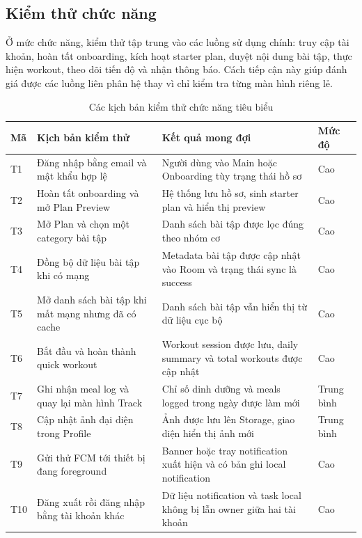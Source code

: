 \subsection{Kiểm thử chức năng}

Ở mức chức năng, kiểm thử tập trung vào các luồng sử dụng chính: truy cập tài khoản, hoàn tất onboarding, kích hoạt starter plan, duyệt nội dung bài tập, thực hiện workout, theo dõi tiến độ và nhận thông báo. Cách tiếp cận này giúp đánh giá được các luồng liên phân hệ thay vì chỉ kiểm tra từng màn hình riêng lẻ.

\begin{table}[H]
\centering
\small
\caption{Các kịch bản kiểm thử chức năng tiêu biểu}
\label{tab:functional-test-scenarios}
\begin{tabular}{|p{1.2cm}|p{4.1cm}|p{4.2cm}|p{2.7cm}|}
\hline
\textbf{Mã} & \textbf{Kịch bản kiểm thử} & \textbf{Kết quả mong đợi} & \textbf{Mức độ} \\ \hline
T1 & Đăng nhập bằng email và mật khẩu hợp lệ & Người dùng vào Main hoặc Onboarding tùy trạng thái hồ sơ & Cao \\ \hline
T2 & Hoàn tất onboarding và mở Plan Preview & Hệ thống lưu hồ sơ, sinh starter plan và hiển thị preview & Cao \\ \hline
T3 & Mở Plan và chọn một category bài tập & Danh sách bài tập được lọc đúng theo nhóm cơ & Cao \\ \hline
T4 & Đồng bộ dữ liệu bài tập khi có mạng & Metadata bài tập được cập nhật vào Room và trạng thái sync là success & Cao \\ \hline
T5 & Mở danh sách bài tập khi mất mạng nhưng đã có cache & Danh sách bài tập vẫn hiển thị từ dữ liệu cục bộ & Cao \\ \hline
T6 & Bắt đầu và hoàn thành quick workout & Workout session được lưu, daily summary và total workouts được cập nhật & Cao \\ \hline
T7 & Ghi nhận meal log và quay lại màn hình Track & Chỉ số dinh dưỡng và meals logged trong ngày được làm mới & Trung bình \\ \hline
T8 & Cập nhật ảnh đại diện trong Profile & Ảnh được lưu lên Storage, giao diện hiển thị ảnh mới & Trung bình \\ \hline
T9 & Gửi thử FCM tới thiết bị đang foreground & Banner hoặc tray notification xuất hiện và có bản ghi local notification & Cao \\ \hline
T10 & Đăng xuất rồi đăng nhập bằng tài khoản khác & Dữ liệu notification và task local không bị lẫn owner giữa hai tài khoản & Cao \\ \hline
\end{tabular}
\normalsize
\end{table}

